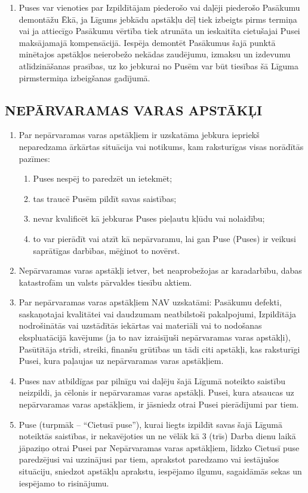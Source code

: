 \begin{multicols}{2}
\begin{enumerate}
	\item Puses var vienoties par Izpildītājam piederošo vai daļēji piederošo Pasākumu demontāžu Ēkā, ja Līgums jebkādu apstākļu dēļ tiek izbeigts pirms termiņa vai ja attiecīgo Pasākumu vērtība tiek atrunāta un ieskaitīta cietušajai Pusei maksājamajā kompensācijā. Iespēja demontēt Pasākumus šajā punktā minētajos apstākļos neierobežo nekādas zaudējumu, izmaksu un izdevumu atlīdzināšanas prasības, uz ko jebkurai no Pusēm var būt tiesības šā Līguma pirmstermiņa izbeigšanas gadījumā.
\end{enumerate}

\subsection{NEPĀRVARAMAS VARAS APSTĀKĻI}
\begin{enumerate}
	\item Par nepārvaramas varas apstākļiem ir uzskatāma jebkura iepriekš neparedzama ārkārtas situācija vai notikums, kam raksturīgas visas norādītās pazīmes:
	\begin{enumerate}
		\item Puses nespēj to paredzēt un ietekmēt;
		\item tas traucē Pusēm pildīt savas saistības;
		\item nevar kvalificēt kā jebkuras Puses pieļautu kļūdu vai nolaidību;
		\item to var pierādīt vai atzīt kā nepārvaramu, lai gan Puse (Puses) ir veikusi saprātīgas darbības, mēģinot to novērst.
	\end{enumerate}
	\item Nepārvaramas varas apstākļi ietver, bet neaprobežojas ar karadarbību, dabas katastrofām un valsts pārvaldes tiesību aktiem.
	\item Par nepārvaramas varas apstākļiem NAV uzskatāmi: Pasākumu defekti, saskaņotajai kvalitātei vai daudzumam neatbilstoši pakalpojumi, Izpildītāja nodrošinātās vai uzstādītās iekārtas vai materiāli vai to nodošanas ekspluatācijā kavējums (ja to nav izraisījuši nepārvaramas varas apstākļi), Pasūtītāja strīdi, streiki, finanšu grūtības un tādi citi apstākļi, kas raksturīgi Pusei, kura paļaujas uz nepārvaramas varas apstākļiem.
	\item Puses nav atbildīgas par pilnīgu vai daļēju šajā Līgumā noteikto saistību neizpildi, ja cēlonis ir nepārvaramas varas apstākļi. Pusei, kura atsaucas uz nepārvaramas varas apstākļiem, ir jāsniedz otrai Pusei pierādījumi par tiem.
	\item Puse (turpmāk – “Cietusī puse”), kurai liegts izpildīt savas šajā Līgumā noteiktās saistības, ir nekavējoties un ne vēlāk kā 3 (trīs) Darba dienu laikā jāpaziņo otrai Pusei par Nepārvaramas varas apstākļiem, līdzko Cietusī puse paredzējusi vai uzzinājusi par tiem, aprakstot paredzamo vai iestājušos situāciju, sniedzot apstākļu aprakstu, iespējamo ilgumu, sagaidāmās sekas un iespējamo to risinājumu.

\end{enumerate}
\end{multicols}
